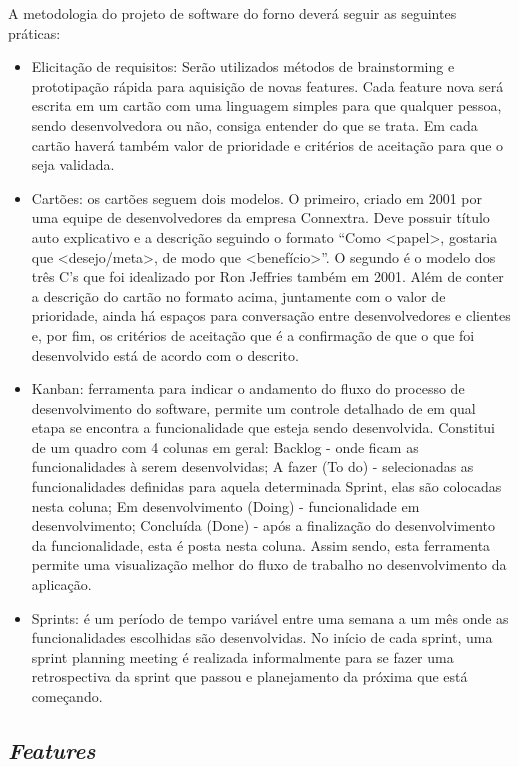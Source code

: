 A metodologia do projeto de software do forno deverá seguir as seguintes práticas:
\begin{itemize}
	\item Elicitação de requisitos: Serão utilizados métodos de brainstorming e prototipação rápida para aquisição de novas features. Cada feature nova será escrita em um cartão com uma linguagem simples para que qualquer pessoa, sendo desenvolvedora ou não, consiga entender do que se trata. Em cada cartão haverá também valor de prioridade e critérios de aceitação para que o seja validada.
	\item Cartões: os cartões seguem dois modelos. O primeiro, criado em 2001 por uma equipe de desenvolvedores da empresa Connextra. Deve possuir título auto explicativo e a descrição seguindo o formato “Como <papel>, gostaria que <desejo/meta>, de modo que <benefício>”. O segundo é o modelo dos três C’s que foi idealizado por Ron Jeffries também em 2001. Além de conter a descrição do cartão no formato acima, juntamente com o valor de prioridade, ainda há espaços para conversação entre desenvolvedores e clientes e, por fim, os critérios de aceitação que é a confirmação de que o que foi desenvolvido está de acordo com o descrito.
	\item Kanban: ferramenta para indicar o andamento do fluxo do processo de desenvolvimento do software, permite um controle detalhado de em qual etapa se encontra a funcionalidade que esteja sendo desenvolvida. Constitui de um quadro com 4 colunas em geral: Backlog - onde ficam as funcionalidades à serem desenvolvidas; A fazer (To do) - selecionadas as funcionalidades definidas para aquela determinada Sprint, elas são colocadas nesta coluna; Em desenvolvimento (Doing) - funcionalidade em desenvolvimento; Concluída (Done) - após a finalização do desenvolvimento da funcionalidade, esta é posta nesta coluna. Assim sendo, esta ferramenta permite uma visualização melhor do fluxo de trabalho no desenvolvimento da aplicação.
	\item Sprints: é um período de tempo variável entre uma semana a um mês onde as funcionalidades escolhidas são desenvolvidas. No início de cada sprint, uma sprint planning meeting é realizada informalmente para se fazer uma retrospectiva da sprint que passou e planejamento da próxima que está começando.
	
\end{itemize}

\subsection{\textit{Features}}


